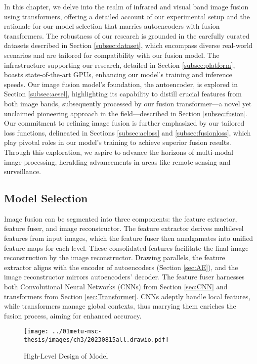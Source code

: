 \label{chp:b3}

In this chapter, we delve into the realm of infrared and visual band image fusion using transformers, offering a detailed account of our experimental setup and the rationale for our model selection that marries autoencoders with fusion transformers. The robustness of our research is grounded in the carefully curated datasets described in Section \ref{subsec:dataset}, which encompass diverse real-world scenarios and are tailored for compatibility with our fusion model. The infrastructure supporting our research, detailed in Section \ref{subsec:platform}, boasts state-of-the-art GPUs, enhancing our model's training and inference speeds. Our image fusion model's foundation, the autoencoder, is explored in Section \ref{subsec:aesel}, highlighting its capability to distill crucial features from both image bands, subsequently processed by our fusion transformer—a novel yet unclaimed pioneering approach in the field—described in Section \ref{subsec:fusion}. Our commitment to refining image fusion is further emphasized by our tailored loss functions, delineated in Sections \ref{subsec:aeloss} and \ref{subsec:fusionloss}, which play pivotal roles in our model's training to achieve superior fusion results. Through this exploration, we aspire to advance the horizons of multi-modal image processing, heralding advancements in areas like remote sensing and surveillance.
\subsection{Model Selection} \label{sec:model}

Image fusion can be segmented into three components: the feature extractor, feature fuser, and image reconstructor. The feature extractor derives multilevel features from input images, which the feature fuser then amalgamates into unified feature maps for each level. These consolidated features facilitate the final image reconstruction by the image reconstructor. Drawing parallels, the feature extractor aligns with the encoder of autoencoders (Section \ref{sec:AE}), and the image reconstructor mirrors autoencoders' decoder. The feature fuser harnesses both Convolutional Neural Networks (CNNs) from Section \ref{sec:CNN} and transformers from Section \ref{sec:Transformer}. CNNs adeptly handle local features, while transformers manage global contexts, thus marrying them enriches the fusion process, aiming for enhanced accuracy.
\begin{figure}[htbp]
    \centering
    \texttt{[image: ../01metu-msc-thesis/images/ch3/20230815all.drawio.pdf]}
    \caption{High-Level Design of Model}
    \label{fig:ch3:highlevel}
\end{figure}

